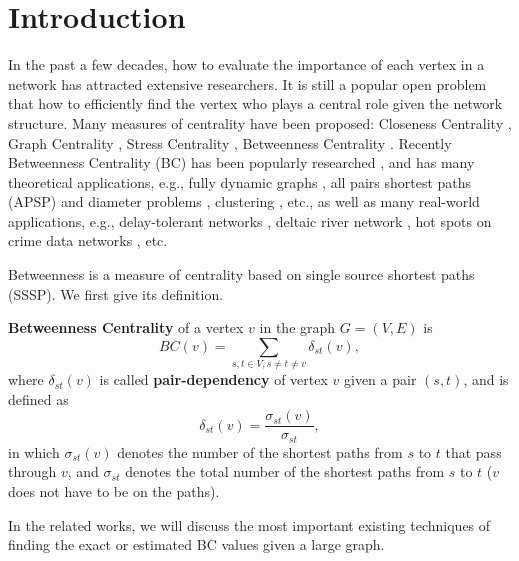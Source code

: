 \documentclass[10pt]{article}
\begin{document}
\section{Introduction}
In the past a few decades, how to evaluate the importance of each vertex in a network has attracted extensive researchers. It is still a popular open problem that how to efficiently find the vertex who plays a central role given the network structure. Many measures of centrality have been proposed: Closeness Centrality \cite{sabidussi1966centrality}, Graph Centrality \cite{hage1995eccentricity}, Stress Centrality \cite{shimbel1953structural}, Betweenness Centrality \cite{freeman1977set}. Recently Betweenness Centrality (BC) has been popularly researched \cite{bader2007approximating, brandes2008variants, abboud2015subcubic}, and has many theoretical applications, e.g., fully dynamic graphs \cite{lee2016efficient}, all pairs shortest paths (APSP) and diameter problems \cite{abboud2015subcubic}, clustering \cite{fairbanks2015behavioral}, etc., as well as many real-world applications, e.g., delay-tolerant networks \cite{magaia2015betweenness}, deltaic river network \cite{cui2015assessment}, hot spots on crime data networks \cite{sivaranjani2015mitigating}, etc.

Betweenness is a measure of centrality based on single source shortest paths (SSSP). We first give its definition.
\begin{definition}
\label{def:bc}
{\bf Betweenness Centrality} \cite{freeman1977set, brandes2001faster, bader2007approximating} of a vertex $v$ in the graph $G=(V,E)$ is
\begin{equation}
BC(v) = \sum_{s,t\in V, s\not=t\not=v} \delta_{st}(v),
\end{equation}
where $\delta_{st}(v)$ is called {\bf pair-dependency} of vertex $v$ given a pair $(s,t)$, and is defined as
\begin{equation}
\delta_{st}(v) = \frac{\sigma_{st}(v)}{\sigma_{st}},
\end{equation}
in which $\sigma_{st}(v)$ denotes the number of the shortest paths from $s$ to $t$ that pass through $v$, and $\sigma_{st}$ denotes the total number of the shortest paths from $s$ to $t$ ($v$ does not have to be on the paths).
\end{definition}
In the related works, we will discuss the most important existing techniques of finding the exact or estimated BC values given a large graph.
\end{document}
